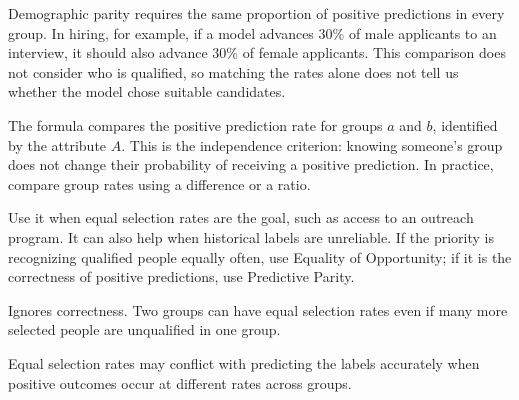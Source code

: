 \clearpage
\thispagestyle{biasfairnesstyle}
\label{sec:demographic-parity}

Demographic parity requires the same proportion of positive predictions in every group. In hiring, for example, if a model advances $30\%$ of male applicants to an interview, it should also advance $30\%$ of female applicants. This comparison does not consider who is qualified, so matching the rates alone does not tell us whether the model chose suitable candidates.

\begin{metricformula}
\end{metricformula}

The formula compares the positive prediction rate for groups $a$ and $b$, identified by the attribute $A$. This is the independence criterion: knowing someone's group does not change their probability of receiving a positive prediction. In practice, compare group rates using a difference or a ratio.


Use it when equal selection rates are the goal, such as access to an outreach program. It can also help when historical labels are unreliable. If the priority is recognizing qualified people equally often, use Equality of Opportunity; if it is the correctness of positive predictions, use Predictive Parity.


{
\item Ignores correctness. Two groups can have equal selection rates even if many more selected people are unqualified in one group.
\item Equal selection rates may conflict with predicting the labels accurately when positive outcomes occur at different rates across groups.
}

